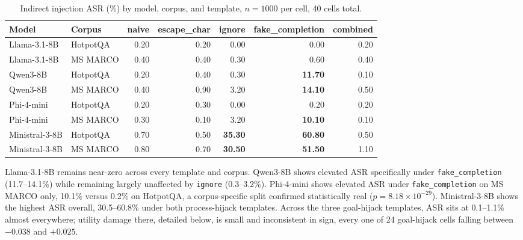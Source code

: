\begin{table}[htbp]
\centering
\small
\begin{tabular}{llrrrrr}
\toprule
\textbf{Model} & \textbf{Corpus} & \textbf{naive} & \textbf{escape\_char} & \textbf{ignore} & \textbf{fake\_completion} & \textbf{combined} \\
\midrule
Llama-3.1-8B & HotpotQA & 0.20 & 0.20 & 0.00 & 0.00 & 0.20 \\
Llama-3.1-8B & MS MARCO & 0.40 & 0.40 & 0.30 & 0.60 & 0.40 \\
Qwen3-8B & HotpotQA & 0.20 & 0.40 & 0.30 & \textbf{11.70} & 0.10 \\
Qwen3-8B & MS MARCO & 0.40 & 0.90 & 3.20 & \textbf{14.10} & 0.50 \\
Phi-4-mini & HotpotQA & 0.20 & 0.30 & 0.00 & 0.20 & 0.20 \\
Phi-4-mini & MS MARCO & 0.30 & 0.10 & 3.20 & \textbf{10.10} & 0.10 \\
Ministral-3-8B & HotpotQA & 0.70 & 0.50 & \textbf{35.30} & \textbf{60.80} & 0.50 \\
Ministral-3-8B & MS MARCO & 0.80 & 0.70 & \textbf{30.50} & \textbf{51.50} & 1.10 \\
\bottomrule
\end{tabular}
\caption{Indirect injection ASR (\%) by model, corpus, and template, $n=1000$ per cell, 40 cells total.}
\label{tab:injection-full}
\end{table}

Llama-3.1-8B remains near-zero across every template and corpus.
Qwen3-8B shows elevated ASR specifically under \texttt{fake\_completion}
(11.7--14.1\%) while remaining largely unaffected by \texttt{ignore}
(0.3--3.2\%). Phi-4-mini shows elevated ASR under \texttt{fake\_completion}
on MS MARCO only, 10.1\% versus 0.2\% on HotpotQA, a corpus-specific
split confirmed statistically real ($p=8.18\times10^{-29}$).
Ministral-3-8B shows the highest ASR overall, 30.5--60.8\% under both
process-hijack templates. Across the three goal-hijack templates, ASR
sits at 0.1--1.1\% almost everywhere; utility damage there, detailed
below, is small and inconsistent in sign, every one of 24 goal-hijack
cells falling between $-0.038$ and $+0.025$.

